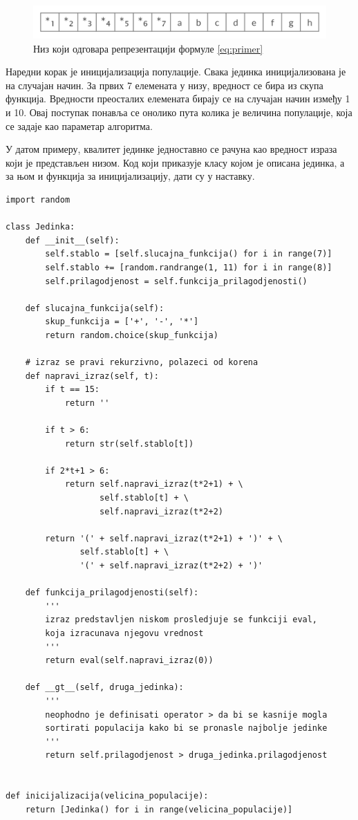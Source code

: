 \documentclass[a4paper]{article}
\begin{document}
\begin{figure}[ht!]
    \begin{center}
        \includegraphics[scale=0.14]{niz_primera.png}
    \end{center}
    \caption{Низ који одговара репрезентацији формуле \eqref{eq:primer}}
    \label{fig:niz}
\end{figure}
\bigskip

Наредни корак је иницијализација популације. Свака јединка иницијализована је на случајан начин. За првих 7 елемената у низу, вредност се бира из скупа функција. Вредности преосталих елемената бирају се на случајан начин између 1 и 10. Овај поступак понавља се онолико пута колика је величина популације, која се задаје као параметар алгоритма. \newline

У датом примеру, квалитет јединке једноставно се рачуна као вредност израза који је представљен низом. Код који приказује класу којом је описана јединка, а за њом и функција за иницијализацију, дати су у наставку. \newline

\smallskip
\begin{lstlisting}[frame=single, label=simple]
import random

class Jedinka:
    def __init__(self):
        self.stablo = [self.slucajna_funkcija() for i in range(7)]
        self.stablo += [random.randrange(1, 11) for i in range(8)]
        self.prilagodjenost = self.funkcija_prilagodjenosti()

    def slucajna_funkcija(self):
        skup_funkcija = ['+', '-', '*']
        return random.choice(skup_funkcija)

    # izraz se pravi rekurzivno, polazeci od korena
    def napravi_izraz(self, t):
        if t == 15:
            return ''

        if t > 6:
            return str(self.stablo[t])

        if 2*t+1 > 6:
            return self.napravi_izraz(t*2+1) + \
                   self.stablo[t] + \
                   self.napravi_izraz(t*2+2)

        return '(' + self.napravi_izraz(t*2+1) + ')' + \
               self.stablo[t] + \
               '(' + self.napravi_izraz(t*2+2) + ')'

    def funkcija_prilagodjenosti(self):
        '''
        izraz predstavljen niskom prosledjuje se funkciji eval,
        koja izracunava njegovu vrednost
        '''
        return eval(self.napravi_izraz(0))

    def __gt__(self, druga_jedinka):
        '''
        neophodno je definisati operator > da bi se kasnije mogla
        sortirati populacija kako bi se pronasle najbolje jedinke
        '''
        return self.prilagodjenost > druga_jedinka.prilagodjenost
        
    
def inicijalizacija(velicina_populacije):
    return [Jedinka() for i in range(velicina_populacije)]
\end{lstlisting}
\end{document}
